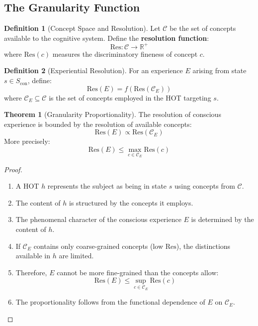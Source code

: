 \documentclass[11pt,a4paper]{article}
\theoremstyle{definition}
\newtheorem{definition}{Definition}[section]
\newtheorem{theorem}{Theorem}[section]
\theoremstyle{remark}
\newcommand{\Scon}{S_{\text{con}}}
\newcommand{\Concept}{\mathcal{C}}
\newcommand{\ConceptE}{\mathcal{C}_E}
\newcommand{\Res}{\text{Res}}
\begin{document}
\subsection{The Granularity Function}

\begin{definition}[Concept Space and Resolution]
\label{def:concept}
Let $\Concept$ be the set of concepts available to the cognitive system. Define the \textbf{resolution function}:
\begin{equation}
\Res: \Concept \to \mathbb{R}^+
\end{equation}
where $\Res(c)$ measures the discriminatory fineness of concept $c$.
\end{definition}

\begin{definition}[Experiential Resolution]
\label{def:exp-res}
For an experience $E$ arising from state $s \in \Scon$, define:
\begin{equation}
\Res(E) = f(\Res(\ConceptE))
\end{equation}
where $\ConceptE \subseteq \Concept$ is the set of concepts employed in the HOT targeting $s$.
\end{definition}

\begin{theorem}[Granularity Proportionality]
\label{thm:granularity}
The resolution of conscious experience is bounded by the resolution of available concepts:
\begin{equation}
\boxed{\Res(E) \propto \Res(\ConceptE)}
\end{equation}
More precisely:
\begin{equation}
\Res(E) \leq \max_{c \in \ConceptE} \Res(c)
\end{equation}
\end{theorem}

\begin{proof}
\begin{enumerate}
    \item A HOT $h$ represents the subject as being in state $s$ using concepts from $\Concept$.
    \item The content of $h$ is structured by the concepts it employs.
    \item The phenomenal character of the conscious experience $E$ is determined by the content of $h$.
    \item If $\ConceptE$ contains only coarse-grained concepts (low $\Res$), the distinctions available in $h$ are limited.
    \item Therefore, $E$ cannot be more fine-grained than the concepts allow:
    \begin{equation}
    \Res(E) \leq \sup_{c \in \ConceptE} \Res(c)
    \end{equation}
    \item The proportionality follows from the functional dependence of $E$ on $\ConceptE$. \qedhere
\end{enumerate}
\end{proof}
\end{document}
